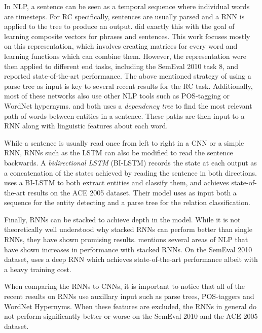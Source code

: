 In NLP, a sentence can be seen as a temporal sequence where individual words are timesteps. For RC specifically, sentences are usually parsed and a RNN is applied to the tree to produce an output. \citep{socher2012} did exactly this with the goal of learning composite vectors for phrases and sentences. This work focuses mostly on this representation, which involves creating matrices for every word and learning functions which can combine them. However, the representation were then applied to different end tasks, including the SemEval 2010 task 8, and reported state-of-the-art performance. 
The above mentioned strategy of using a parse tree as input is key to several recent results for the RC task. Additionally, most of these networks also use other NLP tools such as POS-tagging or WordNet hypernyms. \citep{xu2015a} and \citep{ebrahimi2015} both uses a \emph{dependency tree} to find the most relevant path of words between entities in a sentence. These paths are then input to a RNN along with linguistic features about each word. 

While a sentence is usually read once from left to right in a CNN or a simple RNN, RNNs such as the LSTM can also be modified to read the sentence backwards. A \emph{bidirectional LSTM} (BI-LSTM) records the state at each output as a concatenation of the states achieved by reading the sentence in both directions. \citep{re_lstm} uses a BI-LSTM to both extract entities and classify them, and achieves state-of-the-art results on the ACE 2005 dataset. Their model uses as input both a sequence for the entity detecting and a parse tree for the relation classification.

Finally, RNNs can be stacked to achieve depth in the model. While it is not theoretically well understood why stacked RNNs can perform better than single RNNs, they have shown promising results. \citep{goldberg2015} mentions several areas of NLP that have shown increases in performance with stacked RNNs. On the SemEval 2010 dataset, \citep{xu2016} uses a deep RNN which achieves state-of-the-art performance albeit with a heavy training cost. 

When comparing the RNNs to CNNs, it is important to notice that all of the recent results on RNNs use auxillary input such as parse trees, POS-taggers and WordNet Hypernyms. When these features are excluded, the RNNs in general do not perform significantly better or worse on the SemEval 2010 and the ACE 2005 dataset.   

